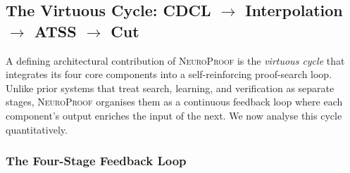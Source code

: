 \documentclass[conference]{IEEEtran}
\newcommand{\NP}{\textsc{NeuroProof}}
\begin{document}
\subsection{The Virtuous Cycle: CDCL $\to$ Interpolation $\to$ ATSS $\to$ Cut}
\label{sec:virtuous-cycle}

A defining architectural contribution of \NP{} is the \emph{virtuous
cycle} that integrates its four core components into a self-reinforcing
proof-search loop.  Unlike prior systems that treat search, learning,
and verification as separate stages, \NP{} organises them as a
continuous feedback loop where each component's output enriches the
input of the next.  We now analyse this cycle quantitatively.

\subsubsection*{The Four-Stage Feedback Loop}
\end{document}
